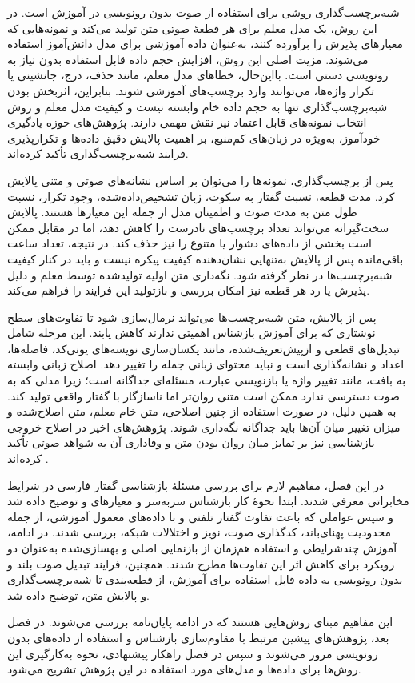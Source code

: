 
شبه‌برچسب‌گذاری روشی برای استفاده از صوت بدون رونویسی در آموزش است. در این روش، یک مدل معلم برای هر قطعهٔ صوتی متن تولید می‌کند و نمونه‌هایی که معیارهای پذیرش را برآورده کنند، به‌عنوان داده آموزشی برای مدل دانش‌آموز استفاده می‌شوند. مزیت اصلی این روش، افزایش حجم داده قابل استفاده بدون نیاز به رونویسی دستی است. بااین‌حال، خطاهای مدل معلم، مانند حذف، درج، جانشینی یا تکرار واژه‌ها، می‌توانند وارد برچسب‌های آموزشی شوند. بنابراین، اثربخش بودن شبه‌برچسب‌گذاری تنها به حجم داده خام وابسته نیست و کیفیت مدل معلم و روش انتخاب نمونه‌های قابل اعتماد نیز نقش مهمی دارند. پژوهش‌های حوزه یادگیری خودآموز، به‌ویژه در زبان‌های کم‌منبع، بر اهمیت پالایش دقیق داده‌ها و تکرارپذیری فرایند شبه‌برچسب‌گذاری تأکید کرده‌اند.

پس از برچسب‌گذاری، نمونه‌ها را می‌توان بر اساس نشانه‌های صوتی و متنی پالایش کرد. مدت قطعه، نسبت گفتار به سکوت، زبان تشخیص‌داده‌شده، وجود تکرار، نسبت طول متن به مدت صوت و اطمینان مدل از جمله این معیارها هستند. پالایش سخت‌گیرانه می‌تواند تعداد برچسب‌های نادرست را کاهش دهد، اما در مقابل ممکن است بخشی از داده‌های دشوار یا متنوع را نیز حذف کند. در نتیجه، تعداد ساعت باقی‌مانده پس از پالایش به‌تنهایی نشان‌دهنده کیفیت پیکره نیست و باید در کنار کیفیت شبه‌برچسب‌ها در نظر گرفته شود. نگه‌داری متن اولیه تولیدشده توسط معلم و دلیل پذیرش یا رد هر قطعه نیز امکان بررسی و بازتولید این فرایند را فراهم می‌کند.

پس از پالایش، متن شبه‌برچسب‌ها می‌تواند نرمال‌سازی شود تا تفاوت‌های سطح نوشتاری که برای آموزش بازشناس اهمیتی ندارند کاهش یابند. این مرحله شامل تبدیل‌های قطعی و ازپیش‌تعریف‌شده، مانند یکسان‌سازی نویسه‌های یونی‌کد، فاصله‌ها، اعداد و نشانه‌گذاری است و نباید محتوای زبانی جمله را تغییر دهد. اصلاح زبانی وابسته به بافت، مانند تغییر واژه یا بازنویسی عبارت، مسئله‌ای جداگانه است؛ زیرا مدلی که به صوت دسترسی ندارد ممکن است متنی روان‌تر اما ناسازگار با گفتار واقعی تولید کند. به همین دلیل، در صورت استفاده از چنین اصلاحی، متن خام معلم، متن اصلاح‌شده و میزان تغییر میان آن‌ها باید جداگانه نگه‌داری شوند. پژوهش‌های اخیر در اصلاح خروجی بازشناسی نیز بر تمایز میان روان بودن متن و وفاداری آن به شواهد صوتی تأکید کرده‌اند .


در این فصل، مفاهیم لازم برای بررسی مسئلهٔ بازشناسی گفتار فارسی در شرایط مخابراتی معرفی شدند. ابتدا نحوهٔ کار بازشناس سربه‌سر و معیارهای  و  توضیح داده شد و سپس عواملی که باعث تفاوت گفتار تلفنی و  با داده‌های معمول آموزشی، از جمله محدودیت پهنای‌باند، کدگذاری صوت، نویز و اختلالات شبکه، بررسی شدند. در ادامه، آموزش چندشرایطی و استفاده هم‌زمان از بازنمایی اصلی و بهسازی‌شده به‌عنوان دو رویکرد برای کاهش اثر این تفاوت‌ها مطرح شدند. همچنین، فرایند تبدیل صوت بلند و بدون رونویسی به داده قابل استفاده برای آموزش، از قطعه‌بندی تا شبه‌برچسب‌گذاری و پالایش متن، توضیح داده شد.

این مفاهیم مبنای روش‌هایی هستند که در ادامه پایان‌نامه بررسی می‌شوند. در فصل بعد، پژوهش‌های پیشین مرتبط با مقاوم‌سازی بازشناس و استفاده از داده‌های بدون رونویسی مرور می‌شوند و سپس در فصل راهکار پیشنهادی، نحوه به‌کارگیری این روش‌ها برای داده‌ها و مدل‌های مورد استفاده در این پژوهش تشریح می‌شود.
